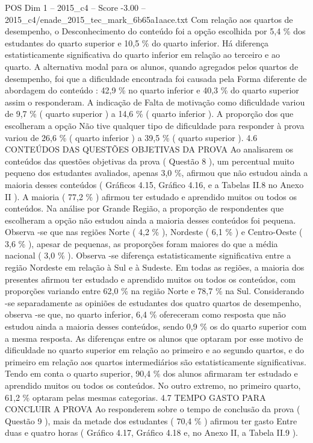 \begin{textsample}{POS Dim 1 – 2015\_c4 – Score -3.00 – 2015\_c4/enade\_2015\_tec\_mark\_6b65a1aace.txt}
Com relação aos quartos de desempenho, o Desconhecimento do conteúdo foi a opção escolhida por 5,4 \% dos estudantes do quarto superior e 10,5 \% do quarto inferior.
Há diferença estatisticamente significativa do quarto inferior em relação ao terceiro e ao quarto.
A alternativa modal para os alunos, quando agregados pelos quartos de desempenho, foi que a dificuldade encontrada foi causada pela Forma diferente de abordagem do conteúdo : 42,9 \% no quarto inferior e 40,3 \% do quarto superior assim o responderam.
A indicação de Falta de motivação como dificuldade variou de 9,7 \% ( quarto superior ) a 14,6 \% ( quarto inferior ).
A proporção dos que escolheram a opção Não tive qualquer tipo de dificuldade para responder à prova variou de 26,6 \% ( quarto inferior ) a 39,5 \% ( quarto superior ). 4.6 CONTEÚDOS DAS QUESTÕES OBJETIVAS DA PROVA Ao analisarem os conteúdos das questões objetivas da prova ( Questão 8 ), um percentual muito pequeno dos estudantes avaliados, apenas 3,0 \%, afirmou que não estudou ainda a maioria desses conteúdos ( Gráficos 4.15, Gráfico 4.16, e a Tabelas II.8 no Anexo II ).
A maioria ( 77,2 \% ) afirmou ter estudado e aprendido muitos ou todos os conteúdos.
Na análise por Grande Região, a proporção de respondentes que escolheram a opção não estudou ainda a maioria desses conteúdos foi pequena.
Observa -se que nas regiões Norte ( 4,2 \% ), Nordeste ( 6,1 \% ) e Centro-Oeste ( 3,6 \% ), apesar de pequenas, as proporções foram maiores do que a média nacional ( 3,0 \% ).
Observa -se diferença estatisticamente significativa entre a região Nordeste em relação à Sul e à Sudeste.
Em todas as regiões, a maioria dos presentes afirmou ter estudado e aprendido muitos ou todos os conteúdos, com proporções variando entre 62,0 \% na região Norte e 78,7 \% na Sul.
Considerando -se separadamente as opiniões de estudantes dos quatro quartos de desempenho, observa -se que, no quarto inferior, 6,4 \% ofereceram como resposta que não estudou ainda a maioria desses conteúdos, sendo 0,9 \% os do quarto superior com a mesma resposta.
As diferenças entre os alunos que optaram por esse motivo de dificuldade no quarto superior em relação ao primeiro e ao segundo quartos, e do primeiro em relação aos quartos intermediários são estatisticamente significativas.
Tendo em conta o quarto superior, 90,4 \% dos alunos afirmaram ter estudado e aprendido muitos ou todos os conteúdos.
No outro extremo, no primeiro quarto, 61,2 \% optaram pelas mesmas categorias. 4.7 TEMPO GASTO PARA CONCLUIR A PROVA Ao responderem sobre o tempo de conclusão da prova ( Questão 9 ), mais da metade dos estudantes ( 70,4 \% ) afirmou ter gasto Entre duas e quatro horas ( Gráfico 4.17, Gráfico 4.18 e, no Anexo II, a Tabela II.9 ).

\end{textsample}
